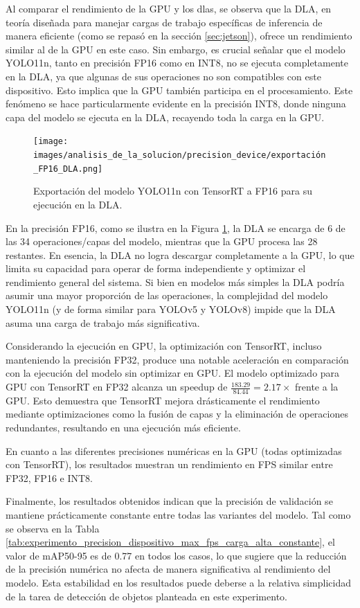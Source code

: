 \documentclass[11pt,spanish,listoffigures,listoftables]{tfgetsinf}
\begin{document}
Al comparar el rendimiento de la GPU y los \glspl{dla}, se observa que la DLA, en teoría diseñada para manejar cargas de trabajo específicas de inferencia de manera eficiente (como se repasó en la sección \ref{sec:jetson}), ofrece un rendimiento similar al de la GPU en este caso. Sin embargo, es crucial señalar que el modelo YOLO11n, tanto en precisión FP16 como en INT8, no se ejecuta completamente en la DLA, ya que algunas de sus operaciones no son compatibles con este dispositivo. Esto implica que la GPU también participa en el procesamiento. Este fenómeno se hace particularmente evidente en la precisión INT8, donde ninguna capa del modelo se ejecuta en la DLA, recayendo toda la carga en la GPU.
\begin{figure}[H]
   \centering
   \texttt{[image: images/analisis\_de\_la\_solucion/precision\_device/exportación\_FP16\_DLA.png]}
   \caption[Exportación del modelo YOLO11n con TensorRT a FP16 para su ejecución en la DLA]{Exportación del modelo YOLO11n con TensorRT a FP16 para su ejecución en la DLA.}
   \label{fig:exportacion_FP16_DLA}
\end{figure}
En la precisión FP16, como se ilustra en la Figura \ref{fig:exportacion_FP16_DLA}, la DLA se encarga de 6 de las 34 operaciones/capas del modelo, mientras que la GPU procesa las 28 restantes. En esencia, la DLA no logra descargar completamente a la GPU, lo que limita su capacidad para operar de forma independiente y optimizar el rendimiento general del sistema. Si bien en modelos más simples la DLA podría asumir una mayor proporción de las operaciones, la complejidad del modelo YOLO11n (y de forma similar para YOLOv5 y YOLOv8) impide que la DLA asuma una carga de trabajo más significativa.

Considerando la ejecución en GPU, la optimización con TensorRT, incluso manteniendo la precisión FP32, produce una notable aceleración en comparación con la ejecución del modelo sin optimizar en GPU. El modelo optimizado para GPU con TensorRT en FP32 alcanza un speedup de $\frac{183.29}{84.44} = 2.17\times$ frente a la GPU. Esto demuestra que TensorRT mejora drásticamente el rendimiento mediante optimizaciones como la fusión de capas y la eliminación de operaciones redundantes, resultando en una ejecución más eficiente.

En cuanto a las diferentes precisiones numéricas en la GPU (todas optimizadas con TensorRT), los resultados muestran un rendimiento en FPS similar entre FP32, FP16 e INT8.


Finalmente, los resultados obtenidos indican que la precisión de validación se mantiene prácticamente constante entre todas las variantes del modelo. Tal como se observa en la Tabla \ref{tab:experimento_precision_dispositivo_max_fps_carga_alta_constante}, el valor de mAP50-95 es de 0.77 en todos los casos, lo que sugiere que la reducción de la precisión numérica no afecta de manera significativa al rendimiento del modelo. Esta estabilidad en los resultados puede deberse a la relativa simplicidad de la tarea de detección de objetos planteada en este experimento.
\end{document}
